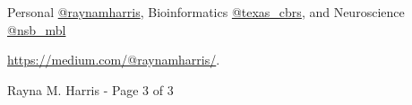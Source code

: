 \documentclass[margin,line]{resume}
\begin{document}
\begin{resume}
\begin{description}{}{
\setlength{\leftmargin}{1cm}%
\setlength{\itemindent}{-1cm}
}
\setlength{\itemsep}{3pt}
\item[Twitter:] Personal \href{http://twitter.com/raynamharris}{@raynamharris}, Bioinformatics \href{http://twitter.com/texas\_cbrs}{@texas\_cbrs}, and Neuroscience \href{http://twitter.com/nsb\_mbl}{@nsb\_mbl} 
\item[Professional/personal blog:] \url{https://medium.com/@raynamharris/}. %

\end{description}







\vspace{0.5 cm}
{\centerline {Rayna M. Harris - Page 3 of 3}}

\end{resume}
\end{document}
